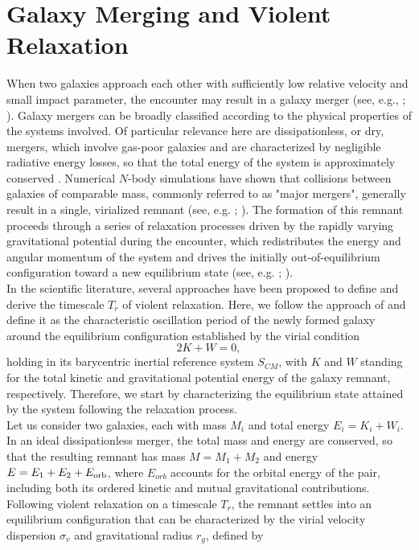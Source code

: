 \documentclass[12pt,twoside,openany]{book}
\begin{document}
\section{Galaxy Merging and Violent Relaxation}
\label{sec:Galaxy Mergers and Violent Relaxation}
When two galaxies approach each other with sufficiently low relative velocity and small impact parameter, the encounter may result in a galaxy merger (see, e.g., \citealt{Toomre_1972};
\citealt{Cimatti_book}). Galaxy mergers can be broadly classified according to the physical properties of the systems involved. Of particular relevance here are dissipationless, or dry, mergers, which involve gas-poor galaxies and are characterized by negligible radiative energy losses, so that the total energy of the system is approximately conserved \parencite{Khochfar_2009}. Numerical $N$-body simulations have shown that collisions between galaxies of comparable mass, commonly referred to as "major mergers", generally result in a single, virialized remnant (see, e.g.  \citealt{Barnes_1992}; \citealt{Hilz_2012}). The formation of this remnant proceeds through a series of relaxation processes driven by the rapidly varying gravitational potential during the encounter, which redistributes the energy and angular momentum of the system and drives the initially out-of-equilibrium configuration toward a new equilibrium state (see, e.g. \citealt{Lynden_1967}; \citealt{Saslaw_1970}).\\In the scientific literature, several approaches have been proposed to define and derive the timescale $T_r$ of violent relaxation. Here, we follow the approach of \textcite{Lynden_1967} and define it as the characteristic oscillation period of the newly formed galaxy around the equilibrium configuration established by the virial condition
\begin{equation}\label{virial condition}
 2K+W=0,
\end{equation}
holding in its barycentric inertial reference system $S_{CM}$, with $K$ and $W$ standing for the total kinetic and gravitational potential energy of the galaxy remnant, respectively. Therefore, we start by characterizing the equilibrium state attained by the system following the relaxation process.\\Let us consider two galaxies, each with mass $M_i$ and total energy $E_i=K_i+W_i$. In an ideal dissipationless merger, the total mass and energy are conserved, so that the resulting remnant has mass $M=M_1+M_2$ and energy $E=E_1+E_2+E_{\rm orb}$, where $E_{orb}$ accounts for the orbital energy of the pair, including both its ordered kinetic and mutual gravitational contributions. Following violent relaxation on a timescale $T_r$, the remnant settles into an equilibrium configuration that can be characterized by the virial velocity dispersion $\sigma_v$ and gravitational radius $r_g$, defined by
\end{document}
